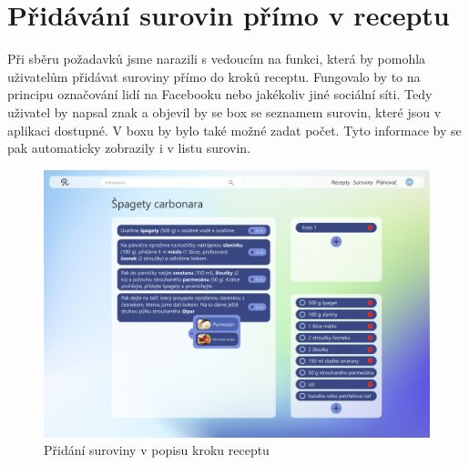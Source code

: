 \section{Přidávání surovin přímo v receptu}
Při sběru požadavků jsme narazili s vedoucím na funkci, která by pomohla uživatelům přidávat suroviny přímo do kroků receptu.
Fungovalo by to na principu označování lidí na Facebooku nebo jakékoliv jiné sociální síti. Tedy uživatel by napsal znak 
a objevil by se box se seznamem surovin, které jsou v aplikaci dostupné. V boxu by bylo také možné zadat počet. Tyto informace
by se pak automaticky zobrazily i v listu surovin.

\begin{figure}[H]
    \includegraphics[width=\textwidth]{pdf/adobexd/suroviny-v-textu}
    \caption{Přidání suroviny v popisu kroku receptu} \label{picture:recipeo:suroviny-v-textu}
\end{figure}
